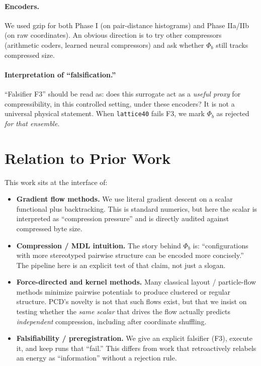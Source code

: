 \documentclass[11pt,a4paper]{article}
\numberwithin{equation}{section}
\newcommand{\phib}{\Phi_b}
\begin{document}
\paragraph{Encoders.}
We used gzip for both Phase I (on pair-distance histograms) and Phase IIa/IIb (on raw coordinates). An obvious direction is to try other compressors (arithmetic coders, learned neural compressors) and ask whether $\phib$ still tracks compressed size.

\paragraph{Interpretation of ``falsification.''}
``Falsifier F3'' should be read as: does this surrogate act as a \emph{useful proxy} for compressibility, in this controlled setting, under these encoders? It is not a universal physical statement. When \texttt{lattice40} fails F3, we mark $\phib$ as rejected \emph{for that ensemble}.

\section{Relation to Prior Work}
This work sits at the interface of:
\begin{itemize}
\item \textbf{Gradient flow methods.}  
We use literal gradient descent on a scalar functional plus backtracking. This is standard numerics, but here the scalar is interpreted as ``compression pressure'' and is directly audited against compressed byte size.

\item \textbf{Compression / MDL intuition.}  
The story behind $\phib$ is: ``configurations with more stereotyped pairwise structure can be encoded more concisely.'' The pipeline here is an explicit test of that claim, not just a slogan.

\item \textbf{Force-directed and kernel methods.}  
Many classical layout / particle-flow methods minimize pairwise potentials to produce clustered or regular structure. PCD's novelty is not that such flows exist, but that we insist on testing whether the \emph{same scalar} that drives the flow actually predicts \emph{independent} compression, including after coordinate shuffling.

\item \textbf{Falsifiability / preregistration.}  
We give an explicit falsifier (F3), execute it, and keep runs that ``fail.'' This differs from work that retroactively relabels an energy as ``information'' without a rejection rule.
\end{itemize}
\end{document}
